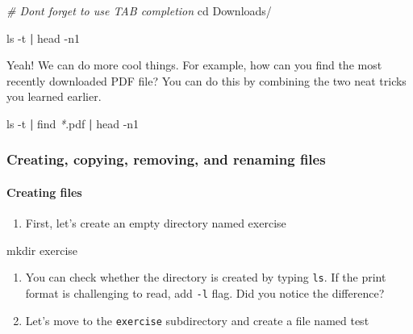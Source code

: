 \documentclass[
]{book}
\newenvironment{Shaded}{\begin{snugshade}}{\end{snugshade}}
\newcommand{\AttributeTok}[1]{\textcolor[rgb]{0.77,0.63,0.00}{#1}}
\newcommand{\BuiltInTok}[1]{#1}
\newcommand{\CommentTok}[1]{\textcolor[rgb]{0.56,0.35,0.01}{\textit{#1}}}
\newcommand{\FunctionTok}[1]{\textcolor[rgb]{0.00,0.00,0.00}{#1}}
\newcommand{\KeywordTok}[1]{\textcolor[rgb]{0.13,0.29,0.53}{\textbf{#1}}}
\newcommand{\NormalTok}[1]{#1}
\newcommand{\PreprocessorTok}[1]{\textcolor[rgb]{0.56,0.35,0.01}{\textit{#1}}}
\providecommand{\tightlist}{%
  \setlength{\itemsep}{0pt}\setlength{\parskip}{0pt}}
\begin{document}
\begin{Shaded}
\begin{Highlighting}[]
\CommentTok{\# Don\textquotesingle{}t forget to use TAB completion}
\BuiltInTok{cd}\NormalTok{ Downloads/ }

\FunctionTok{ls} \AttributeTok{{-}t} \KeywordTok{|} \FunctionTok{head} \AttributeTok{{-}n1}
\end{Highlighting}
\end{Shaded}

Yeah! We can do more cool things. For example, how can you find the most recently downloaded PDF file? You can do this by combining the two neat tricks you learned earlier.

\begin{Shaded}
\begin{Highlighting}[]
\FunctionTok{ls} \AttributeTok{{-}t} \KeywordTok{|} \FunctionTok{find} \PreprocessorTok{*}\NormalTok{.pdf }\KeywordTok{|} \FunctionTok{head} \AttributeTok{{-}n1} 
\end{Highlighting}
\end{Shaded}

\hypertarget{creating-copying-removing-and-renaming-files}{%
\subsubsection{Creating, copying, removing, and renaming files}\label{creating-copying-removing-and-renaming-files}}

\hypertarget{creating-files}{%
\paragraph{Creating files}\label{creating-files}}

\begin{enumerate}
\def\labelenumi{\arabic{enumi}.}
\tightlist
\item
  First, let's create an empty directory named exercise
\end{enumerate}

\begin{Shaded}
\begin{Highlighting}[]

\FunctionTok{mkdir}\NormalTok{ exercise }
\end{Highlighting}
\end{Shaded}

\begin{enumerate}
\def\labelenumi{\arabic{enumi}.}
\setcounter{enumi}{1}
\item
  You can check whether the directory is created by typing \texttt{ls}. If the print format is challenging to read, add \texttt{-l} flag. Did you notice the difference?
\item
  Let's move to the \texttt{exercise} subdirectory and create a file named test
\end{enumerate}
\end{document}
